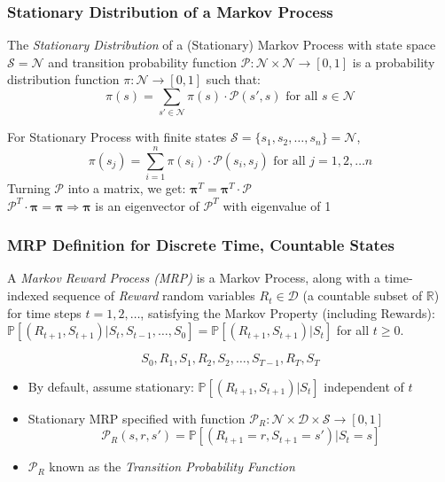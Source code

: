 \documentclass[handout]{beamer}
\begin{document}
\begin{frame}
\frametitle{Stationary Distribution of a Markov Process}
\pause
\begin{definition} 
 The {\em Stationary Distribution} of a (Stationary) Markov Process with state space $\mathcal{S} = \mathcal{N}$ and transition probability function $\mathcal{P}: \mathcal{N} \times \mathcal{N} \rightarrow [0, 1]$ is a probability distribution function $\pi: \mathcal{N} \rightarrow [0, 1]$ such that:
  $$\pi(s) = \sum_{s'\in \mathcal{N}} \pi(s) \cdot \mathcal{P}(s', s) \text{ for all } s \in \mathcal{N}$$
\end{definition}
\pause
For Stationary Process with finite states $\mathcal{S} = \{s_1, s_2, \ldots, s_n\} = \mathcal{N}$,
$$\pi(s_j) = \sum_{i=1}^n \pi(s_i) \cdot \mathcal{P}(s_i, s_j) \text{ for all } j = 1, 2, \ldots n$$
\pause
Turning $\mathcal{P}$ into a matrix, we get: $\bm{\pi}^T = \bm{\pi}^T \cdot \bm{\mathcal{P}}$\\
\pause
$\bm{\mathcal{P}}^T \cdot \bm{\pi}= \bm{\pi} \Rightarrow \bm{\pi}$ is an eigenvector of $\bm{\mathcal{P}}^T$ with eigenvalue of 1
\end{frame}


\begin{frame}
\frametitle{MRP Definition for Discrete Time, Countable States}
\pause
\begin{definition}
 A {\em Markov Reward Process (MRP)} is a Markov Process, along with a time-indexed sequence of {\em Reward} random variables $R_t \in \mathcal{D}$ (a countable subset of $\mathbb{R}$) for time steps $t=1, 2, \ldots$, satisfying the Markov Property (including Rewards): $\mathbb{P}[(R_{t+1}, S_{t+1}) | S_t, S_{t-1}, \ldots, S_0] = \mathbb{P}[(R_{t+1}, S_{t+1}) | S_t]$ for all $t \geq 0$.
 \end{definition}
 \pause
  $$S_0, R_1, S_1, R_2, S_2, \ldots, S_{T-1}, R_T, S_T$$
  \pause
 \begin{itemize}[<+->]
\item By default, assume stationary: $\mathbb{P}[(R_{t+1}, S_{t+1}) | S_t]$ independent of $t$
\item Stationary MRP specified with function $\mathcal{P}_R: \mathcal{N} \times \mathcal{D} \times \mathcal{S} \rightarrow [0,1]$
$$\mathcal{P}_R(s,r,s') = \mathbb{P}[(R_{t+1}=r, S_{t+1}=s') | S_t=s]$$
\item $\mathcal{P}_R$ known as the {\em Transition Probability Function}
\end{itemize}
\end{frame}
\end{document}
